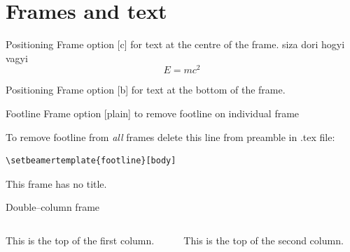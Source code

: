 \documentclass[11pt,t,aspectratio=1610,nonav]{beamer}
\begin{document}

 
\section{Frames and text}
\begin{frame}[c]{Positioning}
Frame option [c] for text at the centre of the frame.
siza dori hogyi vagyi
\begin{equation}
	E=m c^2
\end{equation}
\end{frame}



\begin{frame}[b]{Positioning}
Frame option [b] for text at the bottom of the frame.

\vspace{8mm} %
\end{frame}




\begin{frame}{Footline}   %
\vspace{2.1mm} %
Frame option [plain] to remove footline on individual frame

\vspace{25pt}
To remove footline from \emph{all} frames delete this line from preamble in .tex file: 
\begin{verbatim}
\setbeamertemplate{footline}[body]
\end{verbatim}
\end{frame}




\begin{frame}
	This frame has no title.
\end{frame}




\begin{frame}{Double--column frame}
	\begin{columns}[t]
		\begin{column}{.5\textwidth}
			This is the top of the first column.	
		\end{column}
		\begin{column}{.5\textwidth}
			This is the top of the second column.
		\end{column}
	\end{columns}	
\end{frame}
\end{document}
